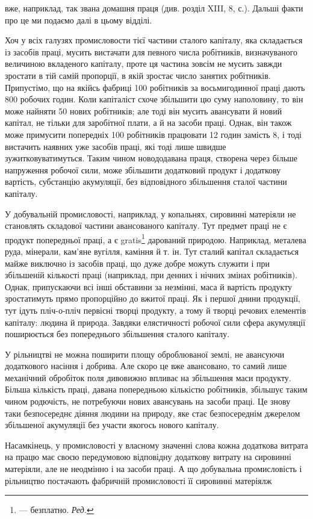 \parcont{}  %
вже, наприклад, так звана домашня праця (див. розділ XIII,
8, с.). Дальші факти про це ми подаємо далі в цьому відділі.

Хоч у всіх галузях промисловости тієї частини сталого капіталу,
яка складається із засобів праці, мусить вистачати для
певного числа робітників, визначуваного величиною вкладеного
капіталу, проте ця частина зовсім не мусить завжди зростати в
тій самій пропорції, в якій зростає число занятих робітників.
Припустімо, що на якійсь фабриці 100 робітників за восьмигодинної
праці дають 800 робочих годин. Коли капіталіст схоче
збільшити цю суму наполовину, то він може найняти 50 нових
робітників; але тоді він мусить авансувати й новий капітал,
не тільки для заробітної плати, а й на засоби праці. Однак, він
також може примусити попередніх 100 робітників працювати
12 годин замість 8, і тоді вистачить наявних уже засобів праці,
які тоді лише швидше зужитковуватимуться. Таким чином новододавана
праця, створена через більше напруження робочої сили,
може збільшити додатковий продукт і додаткову вартість, субстанцію
акумуляції, без відповідного збільшення сталої частини
капіталу.

У добувальній промисловості, наприклад, у копальнях, сировинні
матеріяли не становлять складової частини авансованого
капіталу. Тут предмет праці не є продукт попередньої праці, а
є gratis\footnote*{
— безплатно. \emph{Ред.}
} дарований природою. Наприклад, металева руда, мінерали,
кам’яне вугілля, каміння й т. ін. Тут сталий капітал складається
майже виключно із засобів праці, що дуже добре можуть
служити і при збільшеній кількості праці (наприклад, при денних
і нічних змінах робітників). Однак, припускаючи всі інші
обставини за незмінні, маса й вартість продукту зростатимуть
прямо пропорційно до вжитої праці. Як і першої днини продукції,
тут ідуть пліч-о-пліч первісні творці продукту, а тому й творці
речових елементів капіталу: людина й природа. Завдяки елястичності
робочої сили сфера акумуляції поширюється без попереднього
збільшення сталого капіталу.

У рільництві не можна поширити площу оброблюваної землі,
не авансуючи додаткового насіння і добрива. Але скоро це вже
авансовано, то самий лише механічний обробіток поля дивовижно
впливає на збільшення маси продукту. Більша кількість
праці, давана попередньою кількістю робітників, збільшує таким
чином родючість, не потребуючи нових авансувань на засоби
праці. Це знову таки безпосереднє діяння людини на природу,
яке стає безпосереднім джерелом збільшеної акумуляції без
участи якогось нового капіталу.

Насамкінець, у промисловості у власному значенні слова
кожна додаткова витрата на працю має своєю передумовою відповідну
додаткову витрату на сировинні матеріяли, але не неодмінно
і на засоби праці. А що добувальна промисловість і рільництво
постачають фабричній промисловості її сировинні матеріялж
\parbreak{}  %
